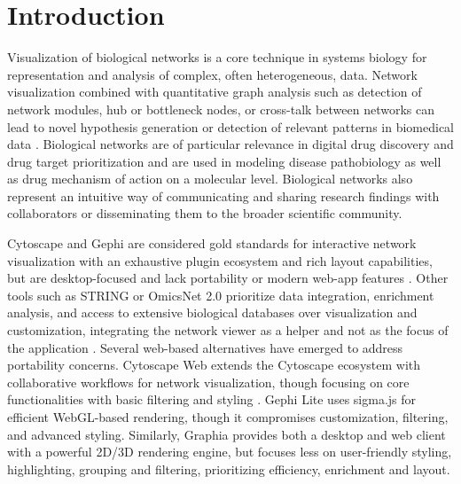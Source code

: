 %

\section{Introduction}
Visualization of biological networks is a core technique in systems biology for representation and analysis of complex, often heterogeneous, data. Network visualization combined with quantitative graph analysis such as detection of network modules, hub or bottleneck nodes, or cross-talk between networks can lead to novel hypothesis generation or detection of relevant patterns in biomedical data \citep{ehlersIntroductionSurveyBiological2025}. Biological networks are of particular relevance in digital drug discovery and drug target prioritization and are used in modeling disease pathobiology as well as drug mechanism of action on a molecular level. Biological networks also represent an intuitive way of communicating and sharing research findings with collaborators or disseminating them to the broader scientific community.

Cytoscape and Gephi are considered gold standards for interactive network visualization with an exhaustive plugin ecosystem and rich layout capabilities, but are desktop-focused and lack portability or modern web-app features \citep{shannonCytoscapeSoftwareEnvironment2003,bastianGephiOpenSource2009}. Other tools such as STRING or OmicsNet 2.0 prioritize data integration, enrichment analysis, and access to extensive biological databases over visualization and customization, integrating the network viewer as a helper and not as the focus of the application \citep{szklarczykSTRINGDatabase20252025,zhouOmicsNet20Webbased2022}. Several web-based alternatives have emerged to address portability concerns. Cytoscape Web extends the Cytoscape ecosystem with collaborative workflows for network visualization, though focusing on core functionalities with basic filtering and styling \citep{onoCytoscapeWebBringing2025}. Gephi Lite uses sigma.js for efficient WebGL-based rendering, though it compromises customization, filtering, and advanced styling. Similarly, Graphia provides both a desktop and web client with a powerful 2D/3D rendering engine, but focuses less on user-friendly styling, highlighting, grouping and filtering, prioritizing efficiency, enrichment and layout.

